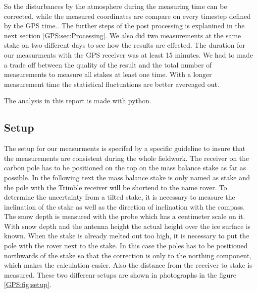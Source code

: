 So the disturbances by the atmosphere during the measuring time can be corrected, while the measured coordinates are compare on every timestep defined by the GPS time.. 
The further steps of the post processing is explanined in the next section \ref{GPS:sec:Processing}.
We also did two measurements at the same stake on two different days to see how the results are effected.
The duration for our measurments with the GPS receiver was at least 15 minutes. 
We had to made a trade off between the quality of the result and the total number of measurements to measure all stakes at least one time. 
With a longer measurement time the statistical fluctuations are better avereaged out.
\medskip

The analysis in this report is made with python.

\subsection{Setup} \label{GPS:subsec:setup}

The setup for our measurments is specifed by a specific guideline to insure that the measurements are consistent during the whole fieldwork.
The receiver on the carbon pole has to be positioned on the top on the mass balance stake as far as possible.
In the following text the mass balance stake is only named as stake and the pole with the Trimble receiver will be shortend to the name rover. 
To determine the uncertainty from a tilted stake, it is necessary to measure the inclination of the stake as well as the direction of inclination with the compass.
The snow depth is measured with the probe which has a centimeter scale on it.
With snow depth and the antenna height the actual height over the ice surface is known. 
When the stake is already melted out too high, it is necessary to put the pole with the rover next to the stake. 
In this case the poles has to be positioned northwards of the stake so that the correction is only to the northing component, which makes the calculation easier. 
Also the distance from the receiver to stake is measured.
These two differenr setups are shown in photographs in the figure \ref{GPS:fig:setup}.

